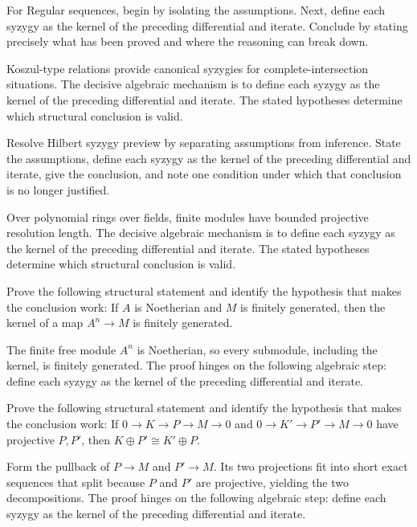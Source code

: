 \begin{problem}\label{prob:v24-problem-07}
For Regular sequences, begin by isolating the assumptions. Next, define each syzygy as the kernel of the preceding differential and iterate. Conclude by stating precisely what has been proved and where the reasoning can break down.
\end{problem}
\begin{solution}
Koszul-type relations provide canonical syzygies for complete-intersection situations. The decisive algebraic mechanism is to define each syzygy as the kernel of the preceding differential and iterate. The stated hypotheses determine which structural conclusion is valid.
\end{solution}

\begin{problem}\label{prob:v24-problem-08}
Resolve Hilbert syzygy preview by separating assumptions from inference. State the assumptions, define each syzygy as the kernel of the preceding differential and iterate, give the conclusion, and note one condition under which that conclusion is no longer justified.
\end{problem}
\begin{solution}
Over polynomial rings over fields, finite modules have bounded projective resolution length. The decisive algebraic mechanism is to define each syzygy as the kernel of the preceding differential and iterate. The stated hypotheses determine which structural conclusion is valid.
\end{solution}

\begin{problem}\label{prob:v24-problem-09}
Prove the following structural statement and identify the hypothesis that makes the conclusion work: If $A$ is Noetherian and $M$ is finitely generated, then the kernel of a map $A^n\to M$ is finitely generated.
\end{problem}
\begin{solution}
The finite free module $A^n$ is Noetherian, so every submodule, including the kernel, is finitely generated. The proof hinges on the following algebraic step: define each syzygy as the kernel of the preceding differential and iterate.
\end{solution}

\begin{problem}\label{prob:v24-problem-10}
Prove the following structural statement and identify the hypothesis that makes the conclusion work: If $0\to K\to P\to M\to0$ and $0\to K'\to P'\to M\to0$ have projective $P,P'$, then $K\oplus P'\cong K'\oplus P$.
\end{problem}
\begin{solution}
Form the pullback of $P\to M$ and $P'\to M$. Its two projections fit into short exact sequences that split because $P$ and $P'$ are projective, yielding the two decompositions. The proof hinges on the following algebraic step: define each syzygy as the kernel of the preceding differential and iterate.
\end{solution}

